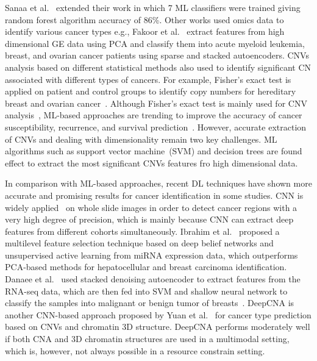 \hspace*{3.5mm} Sanaa et al.~\cite{elsadek2018supervised} extended their work in which 7 ML classifiers were trained giving random forest algorithm accuracy of 86\%. Other works used omics data to identify various cancer types e.g., Fakoor et al.~\cite{fakoor} extract features from high dimensional GE data using PCA and classify them into acute myeloid leukemia, breast, and ovarian cancer patients using sparse and stacked autoencoders. CNVs analysis based on different statistical methods also used to identify significant CN associated with different types of cancers. For example, Fisher's exact test is applied on patient and control groups to identify copy numbers for hereditary breast and ovarian cancer~\cite{58Kuusisto}. Although Fisher's exact test is mainly used for CNV analysis~\cite{fish}, ML-based approaches are trending to improve the accuracy of cancer susceptibility, recurrence, and survival prediction~\cite{16Kourou}. However, accurate extraction of CNVs and dealing with dimensionality remain two key challenges. ML algorithms such as support vector machine~(SVM) and decision trees are found effect to extract the most significant CNVs features fro high dimensional data. 

\hspace*{3.5mm} In comparison with ML-based approaches, recent DL techniques have shown more accurate and promising results for cancer identification in some studies. CNN is widely applied~\cite{19Cruz} on whole slide images in order to detect cancer regions with a very high degree of precision, which is mainly because CNN can extract deep features from different cohorts simultaneously. Ibrahim et al.~\cite{ibrahim} proposed a multilevel feature selection technique based on deep belief networks and unsupervised active learning from miRNA expression data, which outperforms PCA-based methods for hepatocellular and breast carcinoma identification. Danaee et al.~\cite{17Danaee} used stacked denoising autoencoder to extract features from the RNA-seq data, which are then fed into SVM and shallow neural network to classify the samples into malignant or benign tumor of breasts~\cite{18Chen}. DeepCNA is another CNN-based approach proposed by Yuan et al.~\cite{yuan2018cancer} for cancer type prediction based on CNVs and chromatin 3D structure. DeepCNA performs moderately well if both CNA and 3D chromatin structures are used in a multimodal setting, which is, however, not always possible in a resource constrain setting. %

